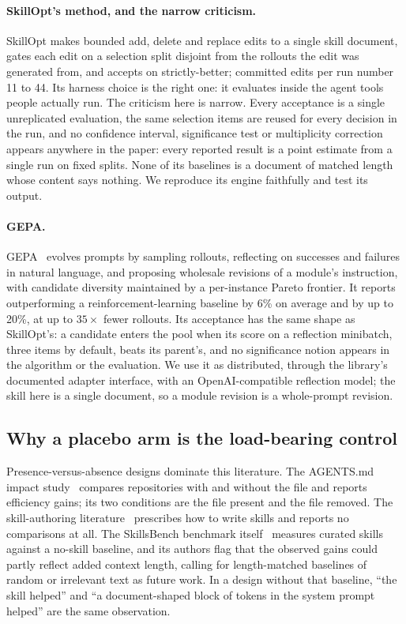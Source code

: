 \paragraph{SkillOpt's method, and the narrow criticism.} SkillOpt makes
bounded add, delete and replace edits to a single skill document, gates each
edit on a selection split disjoint from the rollouts the edit was generated
from, and accepts on strictly-better; committed edits per run number 11 to
44. Its harness choice is the right one: it evaluates inside the agent tools
people actually run. The criticism here is narrow. Every acceptance is a
single unreplicated evaluation, the same selection items are reused for
every decision in the run, and no confidence interval, significance test or
multiplicity correction appears anywhere in the paper: every reported result
is a point estimate from a single run on fixed splits. None of its baselines
is a document of matched length whose content says nothing. We reproduce its
engine faithfully and test its output.

\paragraph{GEPA.} GEPA~\citep{gepa2026} evolves prompts by sampling
rollouts, reflecting on successes and failures in natural language, and
proposing wholesale revisions of a module's instruction, with candidate
diversity maintained by a per-instance Pareto frontier. It reports
outperforming a reinforcement-learning baseline by 6\% on average and by up
to 20\%, at up to $35\times$ fewer rollouts. Its acceptance has the same
shape as SkillOpt's: a candidate enters the pool when its score on a
reflection minibatch, three items by default, beats its parent's, and no
significance notion appears in the algorithm or the evaluation. We use it as
distributed, through the library's documented adapter interface, with an
OpenAI-compatible reflection model; the skill here is a single document, so
a module revision is a whole-prompt revision.

\subsection{Why a placebo arm is the load-bearing control}

Presence-versus-absence designs dominate this literature. The AGENTS.md
impact study~\citep{agentsmd2026} compares repositories with and without the
file and reports efficiency gains; its two conditions are the file present
and the file removed. The skill-authoring
literature~\citep{authoringskills2026} prescribes how to write skills and
reports no comparisons at all. The SkillsBench benchmark
itself~\citep{skillsbench2026li} measures curated skills against a no-skill
baseline, and its authors flag that the observed gains could partly reflect
added context length, calling for length-matched baselines of random or
irrelevant text as future work. In a design without that baseline, ``the
skill helped'' and ``a document-shaped block of tokens in the system prompt
helped'' are the same observation.

